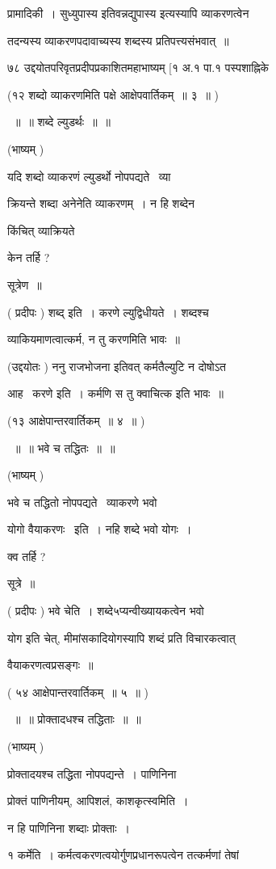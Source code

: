 \documentclass[11pt, openany]{book}
\begin{document}
प्रामादिकी~। सुध्युपास्य इतिवन्नद्युपास्य इत्यस्यापि व्याकरणत्वेन 

तदन्यस्य व्याकरणपदावाच्यस्य शब्दस्य प्रतिपत्त्यसंभवात्~॥ 

७८ उद्दयोतपरिवृतप्रदीपप्रकाशितमहाभाष्यम् [१ अ.१ पा.१ पस्पशाह्निके



(१२ शब्दो व्याकरणमिति पक्षे आक्षेपवार्तिकम्~॥ ३~॥ ) 

~॥~॥ शब्दे ल्युडर्थः~॥~॥ 

(भाष्यम् ) 

यदि शब्दो व्याकरणं ल्युडर्थो नोपपद्यते \textendash\ व्या \textendash\ 

क्रियन्ते शब्दा अनेनेति व्याकरणम्~। न हि शब्देन 

किंचित् व्याक्रियते 

केन तर्हि ? 

सूत्रेण~॥ 

( प्रदीपः ) शब्द् इति~। करणे ल्युद्विधीयते~। शब्दश्च 

व्याकियमाणत्वात्कर्म, न तु करणमिति भावः~॥ 

(उद्दयोतः ) ननु राजभोजना इतिवत् कर्मतैल्युटि न दोषोऽत 

आह \textendash\ करणे इति~। कर्मणि स तु क्वाचित्क इति भावः~॥ 

(१३ आक्षेपान्तरवार्तिकम्~॥ ४~॥ ) 

~॥~॥ भवे च तद्धितः~॥~॥ 

(भाष्यम् ) 

भवे च तद्धितो नोपपद्यते \textendash\ व्याकरणे भवो 

योगो वैयाकरणः \textendash\ इति~। नहि शब्दे भवो योगः~। 

क्व तर्हि ? 

सूत्रे~॥ 

( प्रदीपः ) भवे चेति~। शब्दे५प्यन्वीख्यायकत्वेन भवो 

योग इति चेत्, मीमांसकादियोगस्यापि शब्दं प्रति विचारकत्वात् 

वैयाकरणत्वप्रसङ्गः~॥ 

( ५४ आक्षेपान्तरवार्तिकम्~॥ ५~॥ ) 

~॥~॥ प्रोक्तादधश्च तद्धिताः~॥~॥ 

(भाष्यम् ) 

प्रोक्तादयश्च तद्धिता नोपपद्यन्ते~। पाणिनिना 

प्रोक्तं पाणिनीयम्, आपिशलं, काशकृत्स्वमिति~। 

न हि पाणिनिना शब्दाः प्रोक्ताः~। 



१ कर्मेति~। कर्मत्वकरणत्वयोर्गुणप्रधानरूपत्वेन तत्कर्मणां तेषां 
\end{document}
